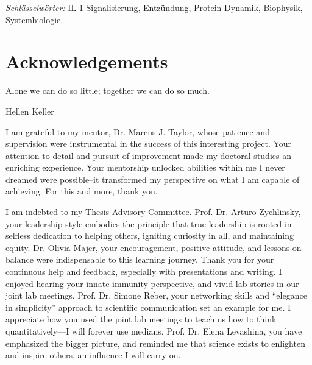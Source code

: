 \textit{Schlüsselwörter:} IL-1-Signalisierung, Entzündung, Protein-Dynamik, Biophysik, Systembiologie.

\cleardoublepage
{}
\chapter*{Acknowledgements}
\epigraph{Alone we can do so little; together we can do so much.}{Hellen Keller}
\sectionmark{}
I am grateful to my mentor, Dr. Marcus J. Taylor, whose patience and supervision were instrumental in the success of this interesting project. Your attention to detail and pursuit of improvement made my doctoral studies an enriching experience. Your mentorship unlocked abilities within me I never dreamed were possible--it transformed my perspective on what I am capable of achieving. For this and more, thank you.

I am indebted to my Thesis Advisory Committee. Prof. Dr. Arturo Zychlinsky, your leadership style embodies the principle that true leadership is rooted in selfless dedication to helping others, igniting curiosity in all, and maintaining equity. Dr. Olivia Majer, your encouragement, positive attitude, and lessons on balance were indispensable to this learning journey. Thank you for your continuous help and feedback, especially with presentations and writing. I enjoyed hearing your innate immunity perspective, and vivid lab stories in our joint lab meetings. Prof. Dr. Simone Reber, your networking skills and “elegance in simplicity” approach to scientific communication set an example for me. I appreciate how you used the joint lab meetings to teach us how to think quantitatively---I will forever use medians. Prof. Dr. Elena Levashina, you have emphasized the bigger picture, and reminded me that science exists to enlighten and inspire others, an influence I will carry on.

